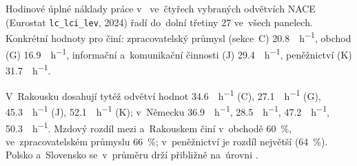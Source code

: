 Hodinové úplné náklady práce v~ ve~čtyřech vybraných odvětvích \acs{NACE} (Eurostat \texttt{lc\_lci\_lev}, 2024) řadí  do~dolní třetiny 27 ve~všech panelech. Konkrétní hodnoty pro  činí: zpracovatelský průmysl (sekce~C) \SI{20,8}{\pps\per\hour}, obchod (G) \SI{16,9}{\pps\per\hour}, informační a~komunikační činnosti (J) \SI{29,4}{\pps\per\hour}, peněžnictví (K) \SI{31,7}{\pps\per\hour}.

V~Rakousku dosahují tytéž odvětví hodnot \SI{34,6}{\pps\per\hour} (C), \SI{27,1}{\pps\per\hour} (G), \SI{45,3}{\pps\per\hour} (J), \SI{52,1}{\pps\per\hour} (K); v~Německu \SI{36,9}{\pps\per\hour}, \SI{28,5}{\pps\per\hour}, \SI{47,2}{\pps\per\hour}, \SI{50,3}{\pps\per\hour}. Mzdový rozdíl mezi  a~Rakouskem činí v~obchodě \SI{60}{\percent}, ve~zpracovatelském průmyslu \SI{66}{\percent}; v~peněžnictví je rozdíl největší (\SI{64}{\percent}). Polsko a~Slovensko se~v~průměru drží přibližně na~úrovni .



